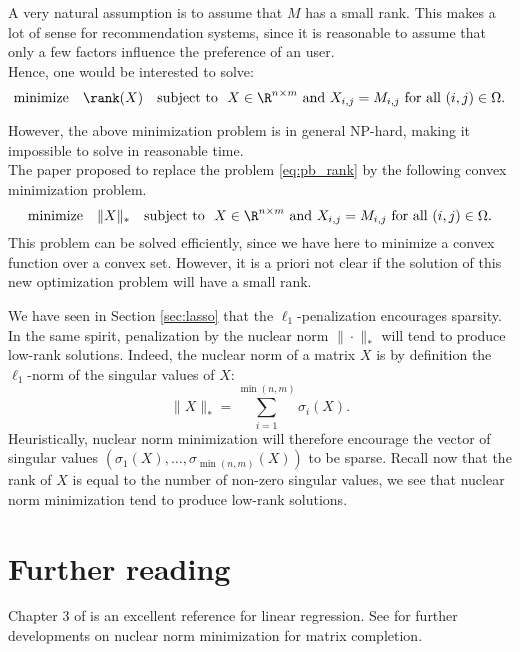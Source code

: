\documentclass[11pt,nocut]{article}
\begin{document}
A very natural assumption is to assume that $M$ has a small rank. 
This makes a lot of sense for recommendation systems, since it is reasonable to assume that only a few factors influence the preference of an user.
\\

Hence, one would be interested to solve:
\begin{equation}\label{eq:pb_rank}
	\text{minimize} \quad \rank(X) \quad \text{subject to } \ X \in \R^{n \times m} \ \text{and} \ X_{i,j} = M_{i,j} \ \text{for all} \ (i,j) \in \Omega.
\end{equation}

However, the above minimization problem is in general NP-hard, making it impossible to solve in reasonable time.
\\

The paper \cite{candes2009exact} proposed to replace the problem \eqref{eq:pb_rank}
by the following convex minimization problem.
\begin{equation}\label{eq:pb_nuclear}
	\text{minimize} \quad \|X\|_* \quad \text{subject to } \ X \in \R^{n \times m} \ \text{and} \ X_{i,j} = M_{i,j} \ \text{for all} \ (i,j) \in \Omega.
\end{equation}
This problem can be solved efficiently, since we have here to minimize a convex function over a convex set. However, it is a priori not clear if the solution of this new optimization problem will have a small rank.

We have seen in Section \ref{sec:lasso} that the $\ell_1$-penalization encourages sparsity.
In the same spirit, penalization by the nuclear norm $\| \cdot \|_*$ will tend to produce low-rank solutions. Indeed, the nuclear norm of a matrix $X$ is by definition the $\ell_1$-norm of the singular values of $X$:
$$
\|X\|_* = \sum_{i=1}^{\min(n,m)} \sigma_i(X).
$$
Heuristically, nuclear norm minimization will therefore encourage the vector of singular values $(\sigma_1(X), \dots,\sigma_{\min(n,m)}(X))$ to be sparse. Recall now that the rank of $X$ is equal to the number of non-zero singular values, we see that nuclear norm minimization tend to produce low-rank solutions.


\section*{Further reading}

Chapter 3 of \cite{friedman2001elements} is an excellent reference for linear regression.
See \cite{candes2009exact,candes2010matrix} for further developments on nuclear norm minimization for matrix completion.

\vspace{1cm}
\centerline{}




\end{document}
